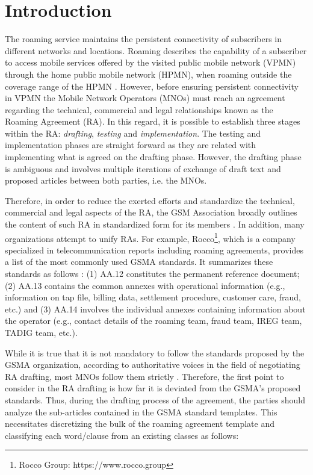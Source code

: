 \section{Introduction}
The roaming service maintains the persistent connectivity of subscribers in different networks and locations. Roaming describes the capability of a subscriber to access mobile services offered by the visited public mobile network (VPMN) through the home public mobile network (HPMN), when roaming outside the coverage range of the HPMN \cite{Tanaka2013}. However, before ensuring persistent connectivity in VPMN the Mobile Network Operators (MNOs) must reach an agreement regarding the technical, commercial and legal relationships known as the Roaming Agreement (RA). In this regard, it is possible to establish three stages within the RA: \textit{drafting}, \textit{testing} and \textit{implementation}. The testing and implementation phases are straight forward as they are related with implementing what is agreed on the drafting phase. However, the drafting phase is ambiguous and involves multiple iterations of exchange of draft text and proposed articles between both parties, i.e. the MNOs. 

Therefore, in order to reduce the exerted efforts and standardize the technical, commercial and legal aspects of the RA, the GSM Association broadly outlines the content of such RA in standardized form for its members \cite{Ferwerda2018}. 
In addition, many organizations attempt to unify RAs. For example, Rocco\footnote{Rocco Group: https://www.rocco.group}, which is a company specialized in telecommunication reports including roaming agreements, provides a list of the most commonly used GSMA standards. It summarizes these standards as follows \cite{ROCCO2017}: (1) AA.12 constitutes the permanent reference document; (2) AA.13 contains the common annexes with operational information (e.g., information on tap file, billing data, settlement procedure, customer care, fraud, etc.) and (3) AA.14 involves the individual annexes containing information about the operator (e.g., contact details of the roaming team, fraud team, IREG team, TADIG team, etc.).

While it is true that it is not mandatory to follow the standards proposed by the GSMA organization, according to authoritative voices in the field of negotiating RA drafting, most MNOs follow them strictly \cite{ROCCO2017a}. Therefore, the first point to consider in the RA drafting is how far it is deviated from the GSMA's proposed standards. Thus, during the drafting process of the agreement, the parties should analyze the sub-articles contained in the GSMA standard templates. This necessitates discretizing the bulk of the roaming agreement template and classifying each word/clause from an existing classes as follows:

